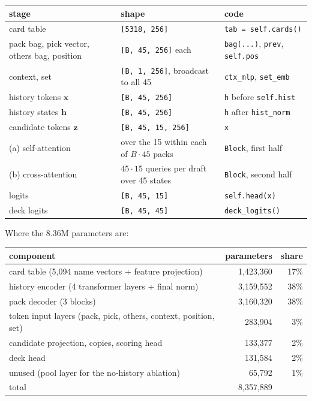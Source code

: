 \documentclass[11pt,letterpaper]{article}
\newcommand{\code}[1]{\texttt{\small #1}}
\newcommand{\shape}[1]{\texttt{\footnotesize[#1]}}
\begin{document}
\begin{center}\small
\begin{tabular}{lll}
\toprule
stage & shape & code \\
\midrule
card table & \shape{5318, 256} & \code{tab = self.cards()} \\
pack bag, pick vector, others bag, position & \shape{B, 45, 256} each & \code{bag(...)}, \code{prev}, \code{self.pos} \\
context, set & \shape{B, 1, 256}, broadcast to all 45 & \code{ctx\_mlp}, \code{set\_emb} \\
history tokens $\mathbf{x}$ & \shape{B, 45, 256} & \code{h} before \code{self.hist} \\
history states $\mathbf{h}$ & \shape{B, 45, 256} & \code{h} after \code{hist\_norm} \\
candidate tokens $\mathbf{z}$ & \shape{B, 45, 15, 256} & \code{x} \\
\quad (a) self-attention & over the 15 within each of $B\cdot45$ packs & \code{Block}, first half \\
\quad (b) cross-attention & $45\cdot15$ queries per draft over 45 states & \code{Block}, second half \\
logits & \shape{B, 45, 15} & \code{self.head(x)} \\
deck logits & \shape{B, 45, 45} & \code{deck\_logits()} \\
\bottomrule
\end{tabular}
\end{center}

Where the 8.36M parameters are:

\begin{center}\small
\begin{tabular}{lrr}
\toprule
component & parameters & share \\
\midrule
card table (5,094 name vectors + feature projection) & 1,423,360 & 17\% \\
history encoder (4 transformer layers + final norm) & 3,159,552 & 38\% \\
pack decoder (3 blocks) & 3,160,320 & 38\% \\
token input layers (pack, pick, others, context, position, set) & 283,904 & 3\% \\
candidate projection, copies, scoring head & 133,377 & 2\% \\
deck head & 131,584 & 2\% \\
unused (pool layer for the no-history ablation) & 65,792 & 1\% \\
\midrule
total & 8,357,889 & \\
\bottomrule
\end{tabular}
\end{center}
\end{document}
